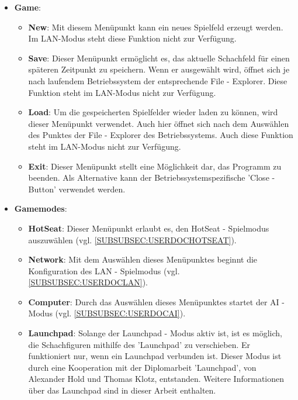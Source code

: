 \documentclass[12pt,a4paper]{article}
\begin{document}
\begin{itemize}
	\item{\textbf{Game}: \begin{itemize}
			\item{\textbf{New}: Mit diesem Menüpunkt kann ein neues Spielfeld erzeugt werden. Im LAN-Modus steht diese Funktion nicht zur Verfügung.  }
			
			\item{\textbf{Save}: Dieser Menüpunkt ermöglicht es, das aktuelle Schachfeld für einen späteren Zeitpunkt zu speichern. Wenn er ausgewählt wird, öffnet sich je nach laufendem Betriebssystem der entsprechende File - Explorer. Diese Funktion steht im LAN-Modus nicht zur Verfügung. }
			
			\item{\textbf{Load}: Um die gespeicherten Spielfelder wieder laden zu können, wird dieser Menüpunkt verwendet. Auch hier öffnet sich nach dem Auswählen des Punktes der File - Explorer des Betriebssystems. Auch diese Funktion steht im LAN-Modus nicht zur Verfügung.  }
			
			\item{\textbf{Exit}: Dieser Menüpunkt stellt eine  Möglichkeit dar, das Programm zu beenden. Als Alternative kann der Betriebssystemspezifische 'Close - Button' verwendet werden.}
		\end{itemize}}
		
	\item{\textbf{Gamemodes}: \begin{itemize}
			
		\item{\textbf{HotSeat}: Dieser Menüpunkt erlaubt es, den HotSeat - Spielmodus auszuwählen (vgl. \ref{SUBSUBSEC:USERDOCHOTSEAT}).}
	
		\item{\textbf{Network}: Mit dem Auswählen dieses Menüpunktes beginnt die Konfiguration des LAN - Spielmodus (vgl. \ref{SUBSUBSEC:USERDOCLAN}). }
		
		\item{\textbf{Computer}: Durch das Auswählen dieses Menüpunktes startet der AI - Modus (vgl. \ref{SUBSUBSEC:USERDOCAI}). }
		
		\item{\textbf{Launchpad}: Solange der Launchpad - Modus aktiv ist, ist es möglich, die Schachfiguren mithilfe des 'Launchpad' zu verschieben. Er funktioniert nur, wenn ein Launchpad verbunden ist. Dieser Modus ist durch eine Kooperation mit der Diplomarbeit 'Launchpad', von Alexander Hold und Thomas Klotz, entstanden. Weitere Informationen über das Launchpad sind in dieser Arbeit enthalten.}	
	\end{itemize}}
	

\end{itemize}
\end{document}
